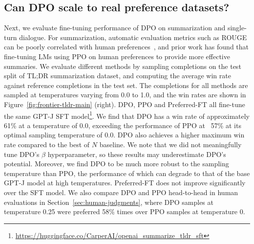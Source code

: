 \subsection{Can DPO scale to real preference datasets?}
\label{sec:dpo-real-datasets}
Next, we evaluate fine-tuning performance of DPO on summarization and single-turn dialogue. For summarization, automatic evaluation metrics such as ROUGE can be poorly correlated with human preferences~\citep{stiennon2022learning}, and prior work has found that fine-tuning LMs using PPO on human preferences to provide more effective summaries. We evaluate different methods by sampling completions on the test split of TL;DR summarization dataset, and computing the average win rate against reference completions in the test set. The completions for all methods are sampled at temperatures varying from 0.0 to 1.0, and the win rates are shown in Figure~\ref{fig:frontier-tldr-main} (right). DPO, PPO and Preferred-FT all fine-tune the same GPT-J SFT model\footnote{\url{https://huggingface.co/CarperAI/openai_summarize_tldr_sft}}. We find that DPO has a win rate of approximately 61\% at a temperature of 0.0, exceeding the performance of PPO at ~57\% at its optimal sampling temperature of 0.0. DPO also achieves a higher maximum win rate compared to the best of $N$ baseline. We note that we did not meaningfully tune DPO's $\beta$ hyperparameter, so these results may underestimate DPO's potential. Moreover, we find DPO to be much more robust to the sampling temperature than PPO, the performance of which can degrade to that of the base GPT-J model at high temperatures. Preferred-FT does not improve significantly over the SFT model. We also compare DPO and PPO head-to-head in human evaluations in Section~\ref{sec:human-judgments}, where DPO samples at temperature 0.25 were preferred 58\% times over PPO samples at temperature 0.

